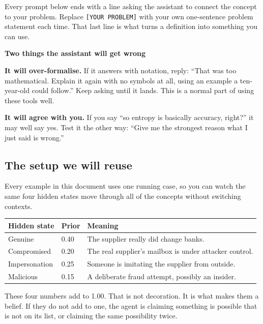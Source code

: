 \documentclass[11pt,a4paper]{article}
\newcommand{\boxtitle}[1]{{\bfseries #1}\par\vspace{2pt}}
\begin{document}
Every prompt below ends with a line asking the assistant to connect the concept to your problem.
Replace \texttt{[YOUR PROBLEM]} with your own one-sentence problem statement each time. That last
line is what turns a definition into something you can use.

\begin{sbbox}
\boxtitle{Two things the assistant will get wrong}
\textbf{It will over-formalise.} If it answers with notation, reply: ``That was too mathematical.
Explain it again with no symbols at all, using an example a ten-year-old could follow.'' Keep
asking until it lands. This is a normal part of using these tools well.

\textbf{It will agree with you.} If you say ``so entropy is basically accuracy, right?'' it may
well say yes. Test it the other way: ``Give me the strongest reason what I just said is wrong.''
\end{sbbox}

\subsection{The setup we will reuse}

Every example in this document uses one running case, so you can watch the same four hidden
states move through all of the concepts without switching contexts.

\begin{center}
\begin{tabular}{@{}L{4.4cm}C{2.2cm}L{7.4cm}@{}}
\toprule
\textbf{Hidden state} & \textbf{Prior} & \textbf{Meaning} \\
\midrule
Genuine        & 0.40 & The supplier really did change banks. \\
Compromised    & 0.20 & The real supplier's mailbox is under attacker control. \\
Impersonation  & 0.25 & Someone is imitating the supplier from outside. \\
Malicious      & 0.15 & A deliberate fraud attempt, possibly an insider. \\
\bottomrule
\end{tabular}
\end{center}

These four numbers add to 1.00. That is not decoration. It is what makes them a belief. If they
do not add to one, the agent is claiming something is possible that is not on its list, or
claiming the same possibility twice.
\end{document}
